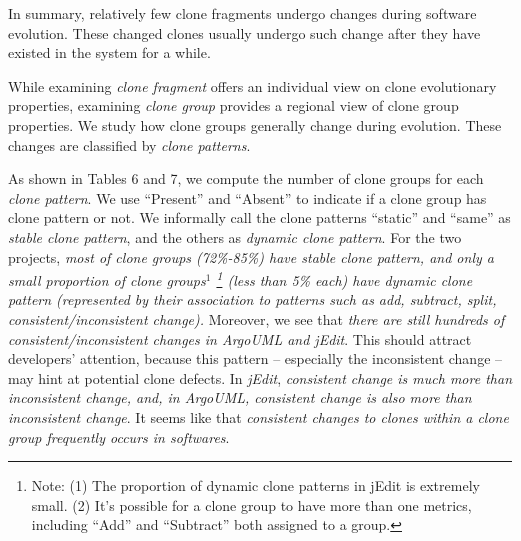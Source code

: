 In summary, relatively few clone fragments undergo changes during software evolution. These changed clones usually undergo such change after they have existed in the system for a while.


While examining {\em clone fragment} offers an individual view on clone evolutionary properties, examining {\em clone group} provides a regional view of clone group properties. %
We study how clone groups generally change during evolution. These changes are classified by {\em clone patterns}.

As shown in Tables 6 and 7, we compute the number of clone groups for each {\em clone pattern}.  We use ``Present'' and ``Absent'' to indicate if a clone group has clone pattern or not. We informally call the clone patterns ``static'' and ``same'' as {\em stable clone pattern}, and the others as {\em dynamic clone pattern}. For the two projects, {\em most of  clone groups (72\%-85\%) have stable clone pattern, and only a small proportion of clone groups$^1$ \footnote{Note: (1) The proportion of dynamic clone patterns in jEdit is extremely small. (2) It's possible for a clone group to have more than one metrics, including ``Add'' and ``Subtract'' both assigned to a group.} (less than 5\% each) have dynamic clone pattern (represented by their association to patterns such as add, subtract, split, consistent/inconsistent change).} Moreover, we see that {\em there are still hundreds of consistent/inconsistent changes in ArgoUML and jEdit}. This should attract developers' attention, because this pattern -- especially the inconsistent change -- may hint at potential clone defects. In {\em jEdit}, {\em consistent change is much more than inconsistent change, and, in ArgoUML, consistent change is also more than inconsistent change}. It seems like that {\em consistent changes to clones within a clone group frequently occurs in softwares}.  

